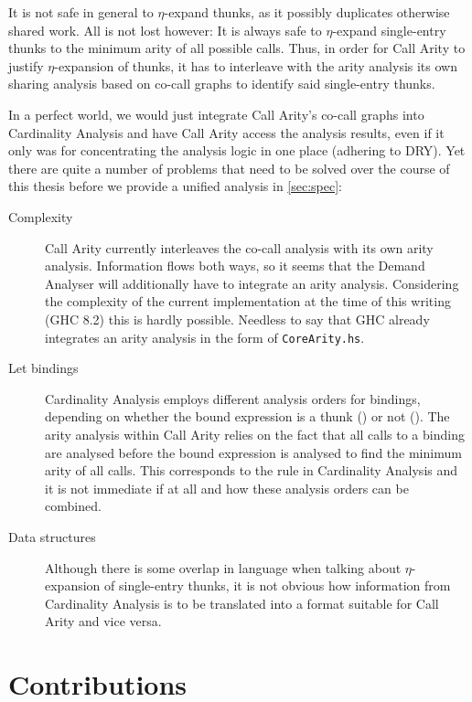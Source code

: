 It is not safe in general to $\eta$-expand thunks, as it possibly duplicates otherwise shared work. 
All is not lost however: It is always safe to $\eta$-expand single-entry thunks to the minimum arity of all possible calls.
Thus, in order for Call Arity to justify $\eta$-expansion of thunks, it has to interleave with the arity analysis its own sharing analysis based on co-call graphs \parencite{callarity} to identify said single-entry thunks.

In a perfect world, we would just integrate Call Arity's co-call graphs into Cardinality Analysis and have Call Arity access the analysis results, even if it only was for concentrating the analysis logic in one place (adhering to DRY).
Yet there are quite a number of problems that need to be solved over the course of this thesis before we provide a unified analysis in \cref{sec:spec}:
\begin{description}
  \item[Complexity] 
    Call Arity currently interleaves the co-call analysis with its own arity analysis.
    Information flows both ways, so it seems that the Demand Analyser will additionally have to integrate an arity analysis.
    Considering the complexity of the current implementation at the time of this writing (GHC 8.2) this is hardly possible.
    Needless to say that GHC already integrates an arity analysis in the form of \texttt{CoreArity.hs}.
  \item[Let bindings]
    Cardinality Analysis employs different analysis orders for  bindings, depending on whether the bound expression is a thunk () or not ().
    The arity analysis within Call Arity relies on the fact that all calls to a binding are analysed before the bound expression is analysed to find the minimum arity of all calls.
    This corresponds to the  rule in Cardinality Analysis and it is not immediate if at all and how these analysis orders can be combined.
  \item[Data structures]
    Although there is some overlap in language when talking about $\eta$-expansion of single-entry thunks, it is not obvious how information from Cardinality Analysis is to be translated into a format suitable for Call Arity and vice versa.
\end{description}

\section{Contributions}\label{sec:contrib}

